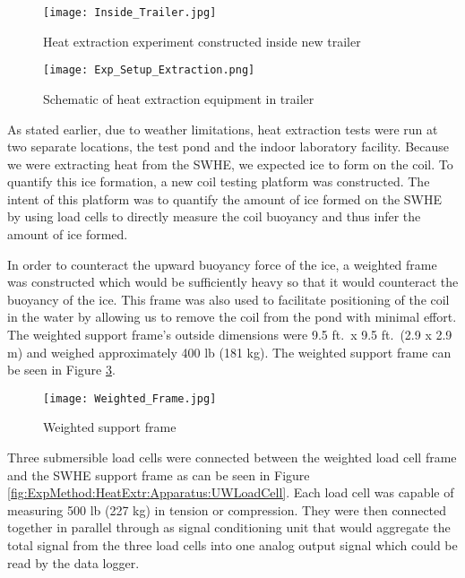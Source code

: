 	\begin{figure}
		\centering
		\texttt{[image: Inside\_Trailer.jpg]}
		\caption[Inside view of heat extraction trailer]{Heat extraction experiment constructed inside new trailer}
		\label{fig:ExpMethod:HeatExtr:Apparatus:ExtrExpTrailerInsidePhoto}
	\end{figure}

	\begin{figure}
		\centering
		\texttt{[image: Exp\_Setup\_Extraction.png]}
		\caption[Schematic of heat extraction equipment in trailer]{Schematic of heat extraction equipment in trailer}
		\label{fig:ExpMethod:HeatExtr:Apparatus:ExtrExpTrailerSchematic}
	\end{figure}

As stated earlier, due to weather limitations, heat extraction tests were run at two separate locations, the test pond and the indoor laboratory facility. Because we were extracting heat from the SWHE, we expected ice to form on the coil. To quantify this ice formation, a new coil testing platform was constructed. The intent of this platform was to quantify the amount of ice formed on the SWHE by using load cells to directly measure the coil buoyancy and thus infer the amount of ice formed.

In order to counteract the upward buoyancy force of the ice, a weighted frame was constructed which would be sufficiently heavy so that it would counteract the buoyancy of the ice. This frame was also used to facilitate positioning of the coil in the water by allowing us to remove the coil from the pond with minimal effort. The weighted support frame's outside dimensions were 9.5 ft.\ x 9.5 ft.\ (2.9 x 2.9 m) and weighed approximately 400 lb (181 kg). The weighted support frame can be seen in Figure \ref{fig:ExpMethod:HeatExtr:Apparatus:WeightedFrame}.

	\begin{figure}
		\centering
		\texttt{[image: Weighted\_Frame.jpg]}
		\caption[Weighted support frame]{Weighted support frame}
		\label{fig:ExpMethod:HeatExtr:Apparatus:WeightedFrame}
	\end{figure}

Three submersible load cells were connected between the weighted load cell frame and the SWHE support frame as can be seen in Figure \ref{fig:ExpMethod:HeatExtr:Apparatus:UWLoadCell}. Each load cell was capable of measuring 500 lb  (227 kg) in tension or compression. They were then connected together in parallel through as signal conditioning unit that would aggregate the total signal from the three load cells into one analog output signal which could be read by the data logger.

